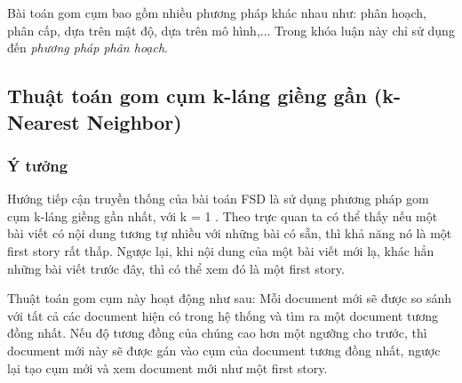 Bài toán gom cụm bao gồm nhiều phương pháp khác nhau như: phân hoạch, phân cấp, dựa trên mật độ, dựa trên mô hình,... Trong khóa luận này chỉ sử dụng đến \textit{phương pháp phân hoạch}.
	
\subsection{Thuật toán gom cụm k-láng giềng gần (k-Nearest Neighbor)}
	\subsubsection{Ý tưởng}
		Hướng tiếp cận truyền thống của bài toán FSD là sử dụng phương pháp gom cụm k-láng giềng gần nhất, với k = 1 \cite{Allan00detectionsbounds}. Theo trực quan ta có thể thấy nếu một bài viết có nội dung tương tự nhiều với những bài có sẵn, thì khả năng nó là một first story rất thấp. Ngược lại, khi nội dung của một bài viết mới lạ, khác hẳn những bài viết trước đây, thì có thể xem đó là một first story.
		
		Thuật toán gom cụm này hoạt động như sau: Mỗi document mới sẽ được so sánh với tất cả các document hiện có trong hệ thống và tìm ra một document tương đồng nhất. Nếu độ tương đồng của chúng cao hơn một ngưỡng cho trước, thì document mới này sẽ được gán vào cụm của document tương đồng nhất, ngược lại tạo cụm mới và xem document mới như một first story.
		
